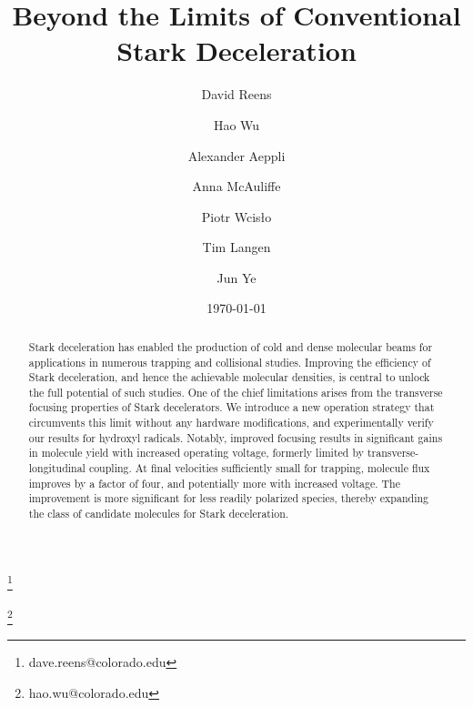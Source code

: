 \documentclass[%
 reprint,
 amsmath,amssymb,
 aps,
prl,
]{revtex4-1}
\begin{document}
\title{Beyond the Limits of Conventional Stark Deceleration}%

\author{David Reens}
\thanks{dave.reens@colorado.edu}


\author{Hao Wu}
\thanks{hao.wu@colorado.edu}

\author{Alexander Aeppli}
\author{Anna McAuliffe}

\author{Piotr Wcis\l o}

\author{Tim Langen}%

\author{Jun Ye}


\date{\today}



\begin{abstract}
Stark deceleration has enabled the production of cold and dense molecular beams for applications in numerous trapping and collisional studies. 
Improving the efficiency of Stark deceleration, and hence the achievable molecular densities, is central to unlock the full potential of such studies.
One of the chief limitations arises from the transverse focusing properties of Stark decelerators. 
We introduce a new operation strategy that circumvents this limit without any hardware modifications, and experimentally verify our results for hydroxyl radicals. 
Notably, improved focusing results in significant gains in molecule yield with increased operating voltage, formerly limited by transverse-longitudinal coupling. 
At final velocities sufficiently small for trapping, molecule flux improves by a factor of four, and potentially more with increased voltage. 
The improvement is more significant for less readily polarized species, thereby expanding the class of candidate molecules for Stark deceleration.
\end{abstract}
\end{document}

